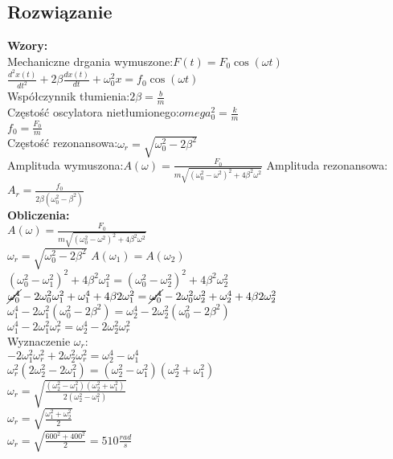 \documentclass[a4paper,14pt]{extarticle}  %
\begin{document}
            \subsection{Rozwiązanie}
                \textbf{Wzory:}\\
                Mechaniczne drgania wymuszone:$F(t)=F_0\cos(\omega t)$\\
                $\frac{d^2x(t)}{dt^2}+2\beta\frac{dx(t)}{dt}+\omega_0^2x=f_0\cos(\omega t)$\\
                Współczynnik tłumienia:$2\beta=\frac{b}{m}$\\
                Częstość oscylatora nietłumionego:$omega_0^2=\frac{k}{m}$\\
                $f_0=\frac{F_0}{m}$\\
                Częstość rezonansowa:$\omega_r=\sqrt{\omega_0^2-2\beta^2}$\\
                Amplituda wymuszona:$A(\omega)=\frac{F_0}{m\sqrt{(\omega_0^2-\omega^2)^2+4\beta^2\omega^2}}$
                Amplituda rezonansowa:$A_r=\frac{f_0}{2\beta(\omega_0^2-\beta^2)}$\\
                \textbf{Obliczenia:}\\
                $A(\omega)=\frac{F_0}{m\sqrt{(\omega_0^2-\omega^2)^2+4\beta^2\omega^2}}$\\
                $\omega_r=\sqrt{\omega_0^2-2\beta^2}$    $A(\omega_1)=A(\omega_2)$\\
                $(\omega_0^2-\omega_1^2)^2+4\beta^2\omega_1^2=(\omega_0^2-\omega_2^2)^2+4\beta^2\omega_2^2$\\
                $\cancel{\omega^4_0}-2\omega^2_0\omega^2_1+\omega^4_1+4\beta2\omega^2_1=\cancel{\omega^4_0}-2\omega^2_0\omega^2_2+\omega^4_2+4\beta2\omega^2_2$\\
                $\omega^4_1-2\omega^2_1(\omega^2_0-2\beta^2)=\omega^4_2-2\omega^2_2(\omega^2_0-2\beta^2)$\\
                $\omega^4_1-2\omega^2_1\omega^2_r=\omega^4_2-2\omega^2_2\omega^2_r$\\
                Wyznaczenie $\omega_r$:\\
                $-2\omega^2_1\omega^2_r+2\omega^2_2\omega^2_r=\omega^4_2-\omega^4_1$\\
                $\omega^2_r(2\omega^2_2-2\omega^2_1)=(\omega^2_2-\omega^2_1)(\omega^2_2+\omega^2_1)$\\
                $\omega_r=\sqrt{\frac{(\omega^2_2-\omega^2_1)(\omega^2_2+\omega^2_1)}{2(\omega^2_2-\omega^2_1)}}$\\
                $\omega_r=\sqrt{\frac{\omega^2_1+\omega^2_2}{2}}$\\
                $\omega_r=\sqrt{\frac{600^2+400^2}{2}}=510\frac{rad}{s}$\\
\end{document}
